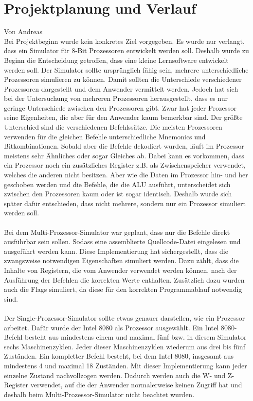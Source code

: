 \documentclass[12pt]{article}
\begin{document}
\newpage

\section{Projektplanung und Verlauf}
Von Andreas\\

\noindent
Bei Projektbeginn wurde kein konkretes Ziel vorgegeben. Es wurde nur verlangt, dass ein Simulator für 8-Bit Prozessoren entwickelt werden soll. Deshalb wurde zu Beginn die Entscheidung getroffen, dass eine kleine Lernsoftware entwickelt werden soll. Der Simulator sollte ursprünglich fähig sein, mehrere unterschiedliche Prozessoren simulieren zu können. Damit sollten die Unterschiede verschiedener Prozessoren dargestellt und dem Anwender vermittelt werden. Jedoch hat sich bei der Untersuchung von mehreren Prozessoren herausgestellt, dass es nur geringe Unterschiede zwischen den Prozessoren gibt. Zwar hat jeder Prozessor seine Eigenheiten, die aber für den Anwender kaum bemerkbar sind. Der größte Unterschied sind die verschiedenen Befehlssätze. Die meisten Prozessoren verwenden für die gleichen Befehle unterschiedliche Mnemonics und Bitkombinationen. Sobald aber die Befehle dekodiert wurden, läuft im Prozessor meistens sehr Ähnliches oder sogar Gleiches ab. Dabei kann es vorkommen, dass ein Prozessor noch ein zusätzliches Register z.B. als Zwischenspeicher verwendet, welches die anderen nicht besitzen. Aber wie die Daten im Prozessor hin- und her geschoben werden und die Befehle, die die ALU ausführt, unterscheidet sich zwischen den Prozessoren kaum oder ist sogar identisch. Deshalb wurde sich später dafür entschieden, dass nicht mehrere, sondern nur ein Prozessor simuliert werden soll.
\\\\
Bei dem Multi-Prozessor-Simulator war geplant, dass nur die Befehle direkt ausführbar sein sollen. Sodass eine assemblierte Quellcode-Datei eingelesen und ausgeführt werden kann. Diese Implementierung hat sichergestellt, dass die zwangsweise notwendigen Eigenschaften simuliert werden. Dazu zählt, dass die Inhalte von Registern, die vom Anwender verwendet werden können, nach der Ausführung der Befehlen die korrekten Werte enthalten. Zusätzlich dazu wurden auch die Flags simuliert, da diese für den korrekten Programmablauf notwendig sind.
\\\\
Der Single-Prozessor-Simulator sollte etwas genauer darstellen, wie ein Prozessor arbeitet. Dafür wurde der Intel 8080 als Prozessor ausgewählt. Ein Intel 8080-Befehl besteht aus mindestens einem und maximal fünf bzw. in diesem Simulator sechs Maschinenzyklen. Jeder dieser Maschinenzyklen wiederum aus drei bis fünf Zuständen. Ein kompletter Befehl besteht, bei dem Intel 8080, insgesamt aus mindestens 4 und maximal 18 Zuständen. Mit dieser Implementierung kann jeder einzelne Zustand nachvollzogen werden. Dadurch werden auch die W- und Z-Register verwendet, auf die der Anwender normalerweise keinen Zugriff hat und deshalb beim Multi-Prozessor-Simulator nicht beachtet wurden.
\\
\end{document}
